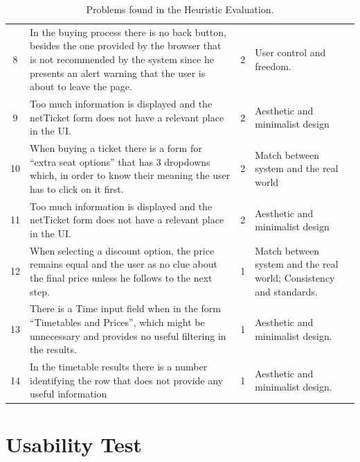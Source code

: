 \documentclass[a4paper]{article}
\begin{document}
\begin{table}[H]
\begin{center}
\begin{tabular}{c | p{8cm} | c | p{4.5cm} }
8 & In the buying process there is no back button, besides the one provided by the browser that is not recommended by the system since he presents an alert warning that the user is about to leave the page. & \cellcolor{orange!20}2 & User control and freedom. \\

9 & Too much information is displayed and the netTicket form does not have a relevant place in the UI. &  \cellcolor{orange!20}2 & Aesthetic and minimalist design\\

10 & When buying a ticket there is a form for ``extra seat options'' that has 3 dropdowns which, in order to know their meaning the user has to click on it first. &  \cellcolor{orange!20}2 & Match between system and the real world\\

11 & Too much information is displayed and the netTicket form does not have a relevant place in the UI. &  \cellcolor{orange!20}2 & Aesthetic and minimalist design\\

12  &  When selecting a discount option, the price remains equal and the user as no clue about the final price unless he follows to the next step. & \cellcolor{yellow!10} 1 &  Match between system and the real world; Consistency and standards. \\

	13  &  There is a Time input field when in the form ``Timetables and Prices'', which might be unnecessary and provides no useful filtering in the results.  & \cellcolor{yellow!10} 1 &  Aesthetic and minimalist design. \\
	
14 &  In the timetable results there is a number identifying the row that does not provide any useful information & \cellcolor{yellow!10} 1 & Aesthetic and minimalist design. \\
	
\hline
\end{tabular}
\end{center}
\caption{Problems found in the Heuristic Evaluation.}
\label{tab:heuristic_results}
\end{table}


\section{Usability Test}
\label{sec:usability_test}
\end{document}
